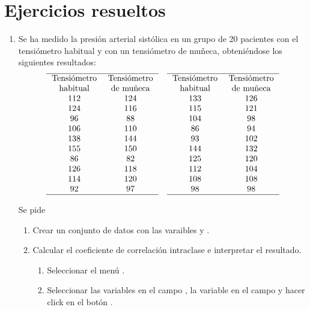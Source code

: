 \section{Ejercicios resueltos}
\begin{enumerate}[leftmargin=*]
\item Se ha medido la presión arterial sistólica en un grupo de 20 pacientes con el tensiómetro habitual y con un
tensiómetro de muñeca, obteniéndose los siguientes resultados:
\[
\begin{array}{cc}
\hline
\multicolumn{1}{p{2cm}}{\centering \text{Tensiómetro} \text{habitual}} & \multicolumn{1}{p{2cm}}{\centering \text{Tensiómetro} \text{de
muñeca}} \\ 
112 & 124 \\ 
124 & 116 \\
 96 &  88 \\
106 & 110 \\
138 & 144 \\
155 & 150 \\
 86 &  82 \\
126 & 118 \\
114 & 120 \\
 92 &  97 \\
\hline
\end{array}
\quad
\begin{array}{cc}
\hline
\multicolumn{1}{p{2cm}}{\centering \text{Tensiómetro} \text{habitual}} & \multicolumn{1}{p{2cm}}{\centering \text{Tensiómetro} \text{de
muñeca}} \\ 
133 & 126 \\
115 & 121 \\
104 &  98 \\
 86 &  94 \\
 93 & 102 \\
144 & 132 \\
125 & 120 \\
112 & 104 \\
108 & 108 \\
 98 &  98 \\
\hline
\end{array}
\]

Se pide
\begin{enumerate}
\item Crear un conjunto de datos con las varaibles  y .

\item Calcular el coeficiente de correlación intraclase e interpretar el resultado.
\begin{indicacion}
\begin{enumerate}
\item Seleccionar el menú .
\item Seleccionar las variables  en el campo , la
variable en el campo  y hacer click en el botón .
\end{enumerate}


\end{indicacion}
\end{enumerate}
\end{enumerate}
